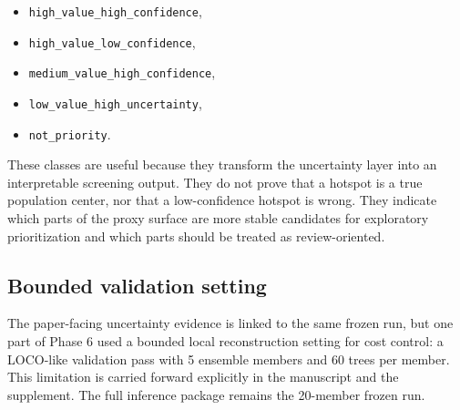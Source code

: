 \begin{itemize}
\item \texttt{high\_value\_high\_confidence},
\item \texttt{high\_value\_low\_confidence},
\item \texttt{medium\_value\_high\_confidence},
\item \texttt{low\_value\_high\_uncertainty},
\item \texttt{not\_priority}.
\end{itemize}

These classes are useful because they transform the uncertainty layer into an interpretable screening output. They do not prove that a hotspot is a true population center, nor that a low-confidence hotspot is wrong. They indicate which parts of the proxy surface are more stable candidates for exploratory prioritization and which parts should be treated as review-oriented.

\subsection{Bounded validation setting}

The paper-facing uncertainty evidence is linked to the same frozen run, but one part of Phase 6 used a bounded local reconstruction setting for cost control: a LOCO-like validation pass with 5 ensemble members and 60 trees per member. This limitation is carried forward explicitly in the manuscript and the supplement. The full inference package remains the 20-member frozen run.

